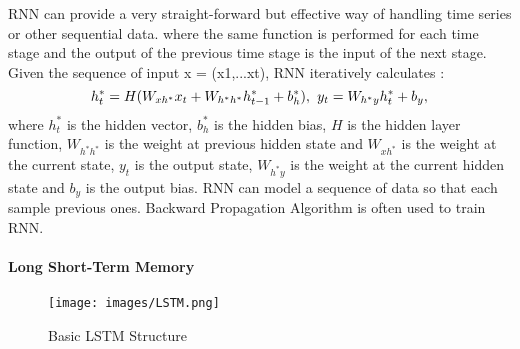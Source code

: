 RNN  can provide a very straight-forward but effective way of handling time series or other sequential data.  where the same function is performed for each time stage and the output of the previous time stage is the input of the next stage.  Given the sequence of input x = (x1,...xt), RNN iteratively calculates  :
\begin{equation}
     h^*_t = H(W_{xh^*}x_t + W_{h^*h^*}h^*_{t-1}+b_h^*), \hspace{0.05in}  y_t = W_{h^*y}h^*_t + b_y,
\end{equation}
where  $h^*_t$ is the  hidden vector,  $b_h^*$ is the hidden bias, $H$ is the hidden layer function, $W_{h^*h^*}$ is the weight at previous hidden state and $W_{xh^*}$ is the weight at the current state, $y_t$ is the output state, $W_{h^*y}$ is the weight at the current hidden state and $b_y$ is the output bias. RNN can model a sequence of data so that each sample   previous ones. Backward Propagation Algorithm is often used to train RNN. 


\paragraph{Long Short-Term Memory}
\vspace{-0.15in}

\begin{figure}
  \begin{center}
\texttt{[image: images/LSTM.png]}
  \end{center}
  \vspace{-10pt}
  \caption{\footnotesize Basic LSTM Structure}
\label{LSTM}
  \vspace{-10pt}
\end{figure}

